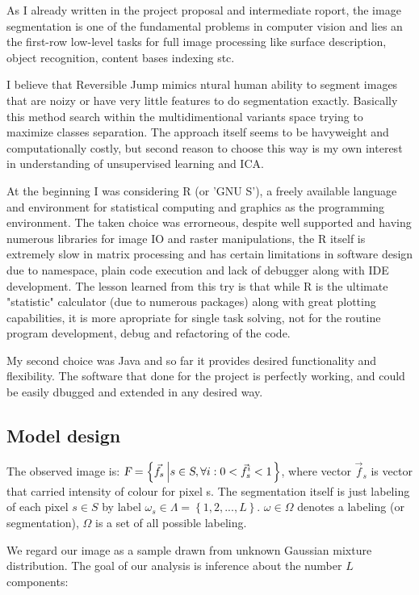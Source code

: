 \documentclass[journal]{IEEEtran}
\begin{document}
As I already written in the project proposal and intermediate roport, the image segmentation is one of the fundamental problems in computer vision and lies an the first-row low-level tasks for full image processing like surface description, object recognition, content bases indexing stc. 

I believe that Reversible Jump mimics ntural human ability to segment images that are noizy or have very little features to do segmentation exactly. Basically this method search within the multidimentional variants space trying to maximize classes separation. The approach itself seems to be havyweight and computationally costly, but second reason to choose this way is my own interest in understanding of unsupervised learning and ICA. 

At the beginning I was considering R (or 'GNU S'), a freely available language and environment for statistical computing and graphics as the programming environment. The taken choice was errorneous, despite well supported and having numerous libraries for image IO and raster manipulations, the R itself is extremely slow in matrix processing and has certain limitations in software design due to namespace, plain code execution and lack of debugger along with IDE development. The lesson learned from this try is that while R is the ultimate "statistic" calculator (due to numerous packages) along with great plotting capabilities, it is more apropriate for single task solving, not for the routine program development, debug and refactoring of the code.

My second choice was Java and so far it provides desired functionality and flexibility. The software that done for the project is perfectly working, and could be easily dbugged and extended in any desired way.

\subsection{Model design}
The observed image is: $\textsl{F} = \left\{ \vec{f}_{s} \left| s \in \textsl{S}, \forall i : 0 < \vec{f}^{i}_{s} < 1 \right. \right\}$,
where vector $\vec{f}_{s}$ is vector that carried intensity of colour for pixel s. The segmentation itself is just labeling of each pixel $s \in S$ by label $\omega_{s} \in \Lambda = \left\{ 1,2,...,L \right\}$. $\omega\in\Omega$ denotes a labeling (or segmentation), $\Omega$ is a set of all possible labeling.

We regard our image as a sample drawn from unknown Gaussian mixture distribution. The goal of our analysis is inference about the number 
$L$ components:
\end{document}
